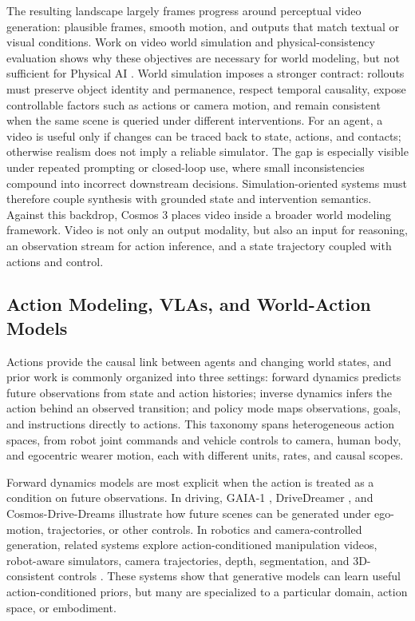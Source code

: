 The resulting landscape largely frames progress around perceptual video generation: plausible frames, smooth motion, and outputs that match textual or visual conditions.
Work on video world simulation and physical-consistency evaluation shows why these objectives are necessary for world modeling, but not sufficient for Physical AI \citep{he2025pre,bansal2024videophy,guo2025t2vphysbench,motamed2025generative}.
World simulation imposes a stronger contract: rollouts must preserve object identity and permanence, respect temporal causality, expose controllable factors such as actions or camera motion, and remain consistent when the same scene is queried under different interventions.
For an agent, a video is useful only if changes can be traced back to state, actions, and contacts; otherwise realism does not imply a reliable simulator.
The gap is especially visible under repeated prompting or closed-loop use, where small inconsistencies compound into incorrect downstream decisions.
Simulation-oriented systems must therefore couple synthesis with grounded state and intervention semantics.
Against this backdrop, Cosmos 3 places video inside a broader world modeling framework.
Video is not only an output modality, but also an input for reasoning, an observation stream for action inference, and a state trajectory coupled with actions and control.

\subsection{Action Modeling, VLAs, and World-Action Models}
Actions provide the causal link between agents and changing world states, and prior work is commonly organized into three settings: forward dynamics predicts future observations from state and action histories; inverse dynamics infers the action behind an observed transition; and policy mode maps observations, goals, and instructions directly to actions.
This taxonomy spans heterogeneous action spaces, from robot joint commands and vehicle controls to camera, human body, and egocentric wearer motion, each with different units, rates, and causal scopes.

Forward dynamics models are most explicit when the action is treated as a condition on future observations.
In driving, GAIA-1 \citep{gaia1}, DriveDreamer \citep{wang2023drivedreamer,zhao2025drivedreamer}, and Cosmos-Drive-Dreams \citep{ren2025cosmos} illustrate how future scenes can be generated under ego-motion, trajectories, or other controls.
In robotics and camera-controlled generation, related systems explore action-conditioned manipulation videos, robot-aware simulators, camera trajectories, depth, segmentation, and 3D-consistent controls \citep{liang2024dreamitate,jang2025dreamgen,robodreamer,zhu2024irasim,hma,gao2026dreamdojo,he2024cameractrl,wang2024motionctrl,xu2024camco,ren2025gen3c}.
These systems show that generative models can learn useful action-conditioned priors, but many are specialized to a particular domain, action space, or embodiment.

